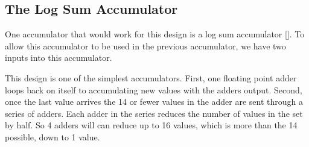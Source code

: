 \subsection{The Log Sum Accumulator}
One accumulator that would work for this design is a log sum accumulator [\cite{prelim:sun1}]. To allow this accumulator to be used in the previous accumulator, we have two inputs into this accumulator.

This design is one of the simplest accumulators. First, one floating point adder loops back on itself to accumulating new values with the adders output. Second, once the last value arrives the 14 or fewer values in the adder are sent through a series of adders. Each adder in the series reduces the number of values in the set by half. So 4 adders will can reduce up to 16 values, which is more than the 14 possible, down to 1 value.

